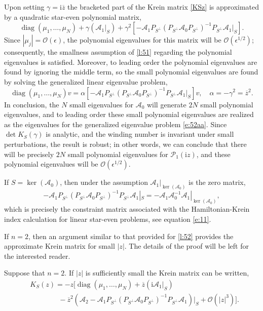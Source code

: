 \documentclass[review,onefignum,onetabnum]{siamart171218}
\def\det{\mathop\mathrm{det}\nolimits}
\def\diag{\mathop\mathrm{diag}\nolimits}
\def\ker{\mathop\mathrm{ker}\nolimits}
\newcommand{\rmi}{\mathrm{i}}
\newcommand{\calA}{\mathcal{A}}
\newcommand{\calO}{\mathcal{O}}
\newcommand{\calP}{\mathcal{P}}
\newcommand{\vK}{\bm{\mathit{K}}}
\newcommand{\vv}{\bm{\mathit{v}}}
\begin{document}
Upon setting $\gamma=\rmi\overline{z}$ the bracketed part of the Krein matrix \cref{KSz} is approximated by a quadratic star-even polynomial matrix,
\[
\diag(\mu_1,\dots,\mu_N)+\gamma\left(\calA_1|_S\right)+
\gamma^2
\left[-\calA_1P_{S^\perp}\left(P_{S^\perp}\calA_0P_{S^\perp}\right)^{-1}P_{S^\perp}\calA_1|_S\right].
\]
Since $|\mu_j|=\calO(\epsilon)$, the polynomial eigenvalues for this matrix will be $\calO(\epsilon^{1/2})$; consequently, the smallness assumption of \cref{l:51} regarding the polynomial eigenvalues is satisfied. Moreover, to leading order the polynomial eigenvalues are found by ignoring the middle term, so the small polynomial eigenvalues are found by solving the generalized linear eigenvalue problem,
\begin{equation}\label{e:52aa}
\diag(\mu_1,\dots,\mu_N)\vv=\alpha
\left[-\calA_1P_{S^\perp}\left(P_{S^\perp}\calA_0P_{S^\perp}\right)^{-1}P_{S^\perp}\calA_1|_S\right]\vv,\quad
\alpha=-\gamma^2=\overline{z}^2.
\end{equation}
In conclusion, the $N$ small eigenvalues for $\calA_0$ will generate $2N$ small polynomial eigenvalues, and to leading order these small polynomial eigenvalues are realized as the eigenvalues for the generalized eigenvalue problem \cref{e:52aa}. Since $\det\vK_S(\gamma)$ is analytic, and the winding number is invariant under small perturbations, the result is robust; in other words, we can conclude that there will be precisely $2N$ small polynomial eigenvalues for $\calP_1(\rmi z)$, and these polynomial eigenvalues will be $\calO(\epsilon^{1/2})$.

\begin{remark}
If $S=\ker(\calA_0)$, then under the assumption $\calA_1|_{\ker(\calA_0)}$ is the zero matrix,
\[
-\calA_1P_{S^\perp}\left(P_{S^\perp}\calA_0P_{S^\perp}\right)^{-1}P_{S^\perp}\calA_1|_S=
-\calA_1\calA_0^{-1}\calA_1|_{\ker(\calA_0)},
\]
which is precisely the constraint matrix associated with the Hamiltonian-Krein index calculation for linear star-even problems, see equation \cref{e:11}.
\end{remark}

If $n=2$, then an argument similar to that provided for \cref{l:52} provides the approximate Krein matrix for small $|z|$.  The details of the proof will be left for the interested reader.

\begin{lemma}\label{l:53}
Suppose that $n=2$. If $|z|$ is sufficiently small the Krein matrix can be written,
\[
\begin{aligned}
&\vK_S(z)=-z\Big[\diag(\mu_1,\dots,\mu_N)+\overline{z}\left(\rmi\calA_1|_S\right)\\
&\qquad\qquad
-\overline{z}^2\left(\calA_2-
\calA_1P_{S^\perp}\left(P_{S^\perp}\calA_0P_{S^\perp}\right)^{-1}P_{S^\perp}\calA_1\right)|_S
+\calO(|z|^3)\Big].
\end{aligned}
\]
\end{lemma}
\end{document}
